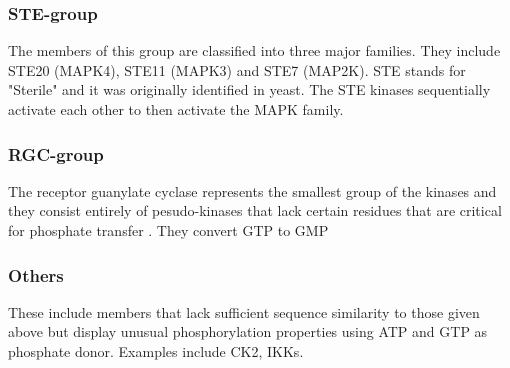 \documentclass[a4paper, 11pt]{article}
\begin{document}
\subsubsection*{STE-group}
The members of this group are classified into three major families. They include STE20 (MAPK4), STE11 (MAPK3) and STE7 (MAP2K).  STE stands for "Sterile" and it was originally identified in yeast. The STE kinases sequentially activate each other to then activate the MAPK family.\\

\subsubsection*{RGC-group}
The receptor guanylate cyclase represents the smallest group of the kinases and they consist entirely of pesudo-kinases that lack certain residues that are critical for phosphate transfer \cite{manning2002protein}. They convert GTP to GMP\\

\subsubsection*{Others}
These include members that lack sufficient sequence similarity to those given above but display unusual phosphorylation properties using ATP and GTP as phosphate donor. Examples include CK2, IKKs.\\
\end{document}
